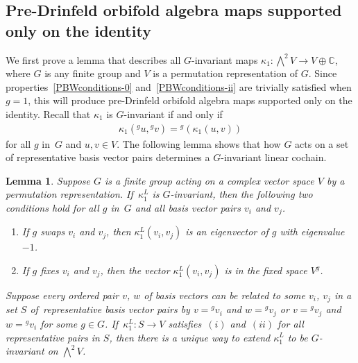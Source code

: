 \documentclass[pdftex]{sigma}
\numberwithin{equation}{section}
\newtheorem{Lemma}[Theorem]{Lemma}
\newcommand{\actby}[1]{{}^{#1}}
\newcommand{\actbylessspace}[1]{{}^{#1}\!}
\begin{document}
\subsection{Pre-Drinfeld orbifold algebra maps supported only on the identity}
We first prove a lemma that describes all $G$-invariant maps $\kappa_1\colon \bigwedge^2 V\to V\oplus \mathbb{C}$,
where $G$ is any finite group and $V$ is a permutation representation of $G$. Since properties~\eqref{PBWconditions-0}
and~\eqref{PBWconditions-ii}
are trivially satisfied when $g=1$, this will produce pre-Drinfeld orbifold algebra
maps supported only on the identity.
Recall that $\kappa_1$ is $G$-invariant if and only if
\begin{gather}
\label{G-inv}
\kappa_1(\actby{g}u,\actby{g}v)=\actbylessspace{g}(\kappa_1(u,v))
\end{gather}
for all $g$ in~$G$ and $u,v\in V$.
The following lemma shows that how $G$ acts on a set of representative basis
vector pairs determines a $G$-invariant linear cochain.

\begin{Lemma}
\label{eigenvectors}
	Suppose $G$ is a finite group acting on a complex vector space $V$ by
	a permutation representation. If~$\kappa^L_1$ is $G$-invariant, then the following two conditions hold for all $g$ in~$G$ and all basis vector pairs $v_i$ and $v_j$.
	\begin{enumerate}[label=$(\roman*)$]\itemsep=0pt
		\item%
If $g$ swaps $v_i$ and $v_j$, then $\kappa^L_1(v_i,v_j)$ is an eigenvector of $g$ with eigenvalue $-1$.
		\item%
If $g$ fixes $v_i$ and $v_j$, then the vector $\kappa^L_1(v_i,v_j)$ is in the fixed space $V^g$.
	\end{enumerate}
Suppose every ordered pair $v$, $w$ of basis vectors can be related to some $v_i$, $v_j$ in a set $S$ of~repre\-sentative basis vector pairs by $v=\actby{g}v_i$ and $w=\actby{g}v_j$ or $v=\actby{g}v_j$ and $w=\actby{g}v_i$ for some $g \in G$. If~$\kappa^L_1\colon S \to V$ satisfies~$(i)$ and~$(ii)$ for all representative pairs in $S$, then there is a unique way to extend $\kappa^L_1$ to be $G$-invariant on $\bigwedge^2 V$.
\end{Lemma}
\end{document}
